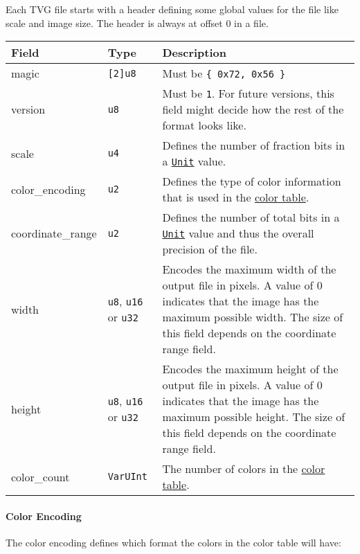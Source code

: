 \documentclass[]{article}
\begin{document}
Each TVG file starts with a header defining some global values for the
file like scale and image size. The header is always at offset 0 in a
file.

\begin{longtable}[]{@{}p{1in}p{2in}p{3in}@{}}
\toprule
Field & Type & Description \\
\midrule
\endhead
magic & \texttt{{[}2{]}u8} & Must be \texttt{\{\ 0x72,\ 0x56\ \}} \\
version & \texttt{u8} & Must be \texttt{1}. For future versions, this
field might decide how the rest of the format looks like. \\
scale & \texttt{u4} & Defines the number of fraction bits in a
\protect\hyperlink{units}{\texttt{Unit}} value. \\
color\_encoding & \texttt{u2} & Defines the type of color information
that is used in the \protect\hyperlink{color-table}{color table}. \\
coordinate\_range & \texttt{u2} & Defines the number of total bits in a
\protect\hyperlink{units}{\texttt{Unit}} value and thus the overall
precision of the file. \\
width & \texttt{u8}, \texttt{u16} or \texttt{u32} & Encodes the maximum
width of the output file in pixels. A value of 0 indicates that the
image has the maximum possible width. The size of this field depends on
the coordinate range field. \\
height & \texttt{u8}, \texttt{u16} or \texttt{u32} & Encodes the maximum
height of the output file in pixels. A value of 0 indicates that the
image has the maximum possible height. The size of this field depends on
the coordinate range field. \\
color\_count & \texttt{VarUInt} & The number of colors in the
\protect\hyperlink{color-table}{color table}. \\
\bottomrule
\end{longtable}

\hypertarget{color-encoding}{%
\paragraph{Color Encoding}\label{color-encoding}}

The color encoding defines which format the colors in the color table
will have:
\end{document}
